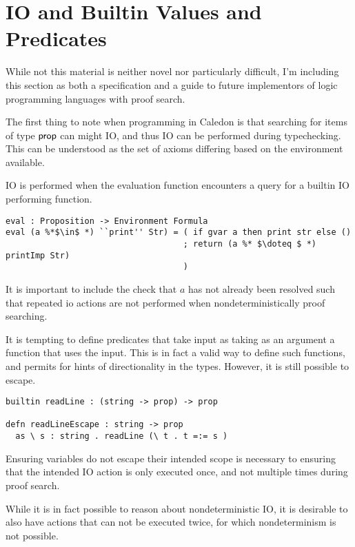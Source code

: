 \section{IO and Builtin Values and Predicates}

While not this material is neither novel nor particularly difficult, 
I'm including this section as both a specification and a guide 
to future implementors of logic programming languages with proof search.

The first thing to note when programming in Caledon is that searching for items of type $\mathsf{prop}$ 
can might IO, and thus IO can be performed during typechecking.  
This can be understood as the set of axioms differing based on the environment available.

IO is performed when the evaluation function encounters a query for a builtin IO performing function.

\begin{lstlisting}
eval : Proposition -> Environment Formula
eval (a %*$\in$ *) ``print'' Str) = ( if gvar a then print str else ()
                                    ; return (a %* $\doteq $ *) printImp Str)
                                    )
\end{lstlisting}

It is important to include the check that $a$ has not already been resolved such that repeated io actions are not performed
when nondeterministically proof searching.  

It is tempting to define predicates that take input as taking as an argument 
a function that uses the input.  This is in fact a valid way to define such functions, 
and permits for hints of directionality in the types.  
However, it is still possible to escape.  

\begin{lstlisting}
builtin readLine : (string -> prop) -> prop

defn readLineEscape : string -> prop
  as \ s : string . readLine (\ t . t =:= s )

\end{lstlisting}

Ensuring variables do not escape their intended scope is necessary to ensuring
that the intended IO action is only executed once, and not multiple times during proof search.

While it is in fact possible to reason about nondeterministic IO, it is desirable to also have actions
that can not be executed twice, for which nondeterminism is not possible.

